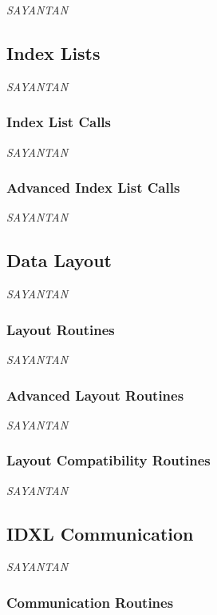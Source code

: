{\it SAYANTAN}

\subsection{Index Lists}
\label{sec:IDXL}

{\it SAYANTAN}

\subsubsection{Index List Calls}

{\it SAYANTAN}

\subsubsection{Advanced Index List Calls}

{\it SAYANTAN}

\subsection{Data Layout}

{\it SAYANTAN}

\subsubsection{Layout Routines}

{\it SAYANTAN}

\subsubsection{Advanced Layout Routines}
\label{sec:IDXLLayoutoffset}

{\it SAYANTAN}

\subsubsection{Layout Compatibility Routines}

{\it SAYANTAN}

\subsection{IDXL Communication}
\label{sec:IDXLComm}

{\it SAYANTAN}

\subsubsection{Communication Routines}

